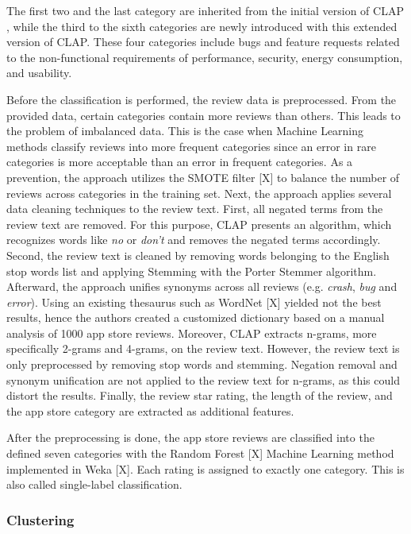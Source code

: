 The first two and the last category are inherited from the initial version of CLAP \cite{Villarroel.2016}, while the third to the sixth categories are newly introduced with this extended version of CLAP. 
These four categories include bugs and feature requests related to the non-functional requirements of performance, security, energy consumption, and usability.

Before the classification is performed, the review data is preprocessed. From the provided data, certain categories contain more reviews than others. This leads to the problem of imbalanced data. This is the case when Machine Learning methods classify reviews into more frequent categories since an error in rare categories is more acceptable than an error in frequent categories. As a prevention, the approach utilizes the SMOTE filter [X] to balance the number of reviews across categories in the training set. 
Next, the approach applies several data cleaning techniques to the review text. First, all negated terms from the review text are removed. For this purpose, CLAP presents an algorithm, which recognizes words like \textit{no} or \textit{don't} and removes the negated terms accordingly. Second, the review text is cleaned by removing words belonging to the English stop words list and applying Stemming with the Porter Stemmer algorithm. 
Afterward, the approach unifies synonyms across all reviews (e.g. \textit{crash}, \textit{bug} and \textit{error}). Using an existing thesaurus such as WordNet [X] yielded not the best results, hence the authors created a customized dictionary based on a manual analysis of 1000 app store reviews. 
Moreover, CLAP extracts n-grams, more specifically 2-grams and 4-grams, on the review text. However, the review text is only preprocessed by removing stop words and stemming. Negation removal and synonym unification are not applied to the review text for n-grams, as this could distort the results.
Finally, the review star rating, the length of the review, and the app store category are extracted as additional features. 

After the preprocessing is done, the app store reviews are classified into the defined seven categories with the Random Forest [X] Machine Learning method implemented in Weka [X]. Each rating is assigned to exactly one category. This is also called single-label classification. 
        
\subsubsection{Clustering}

